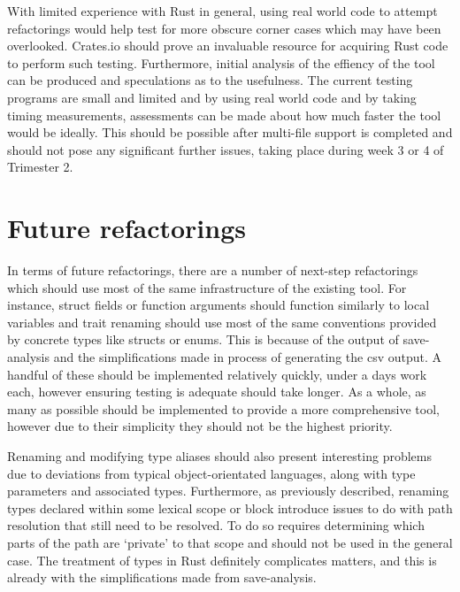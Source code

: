 With limited experience with Rust in general, using real world code to attempt refactorings would help test for more obscure corner cases which may have been overlooked. Crates.io \cite{cratesio15} should prove an invaluable resource for acquiring Rust code to perform such testing. Furthermore, initial analysis of the effiency of the tool can be produced and speculations as to the usefulness. The current testing programs are small and limited and by using real world code and by taking timing measurements, assessments can be made about how much faster the tool would be ideally. This should be possible after multi-file support is completed and should not pose any significant further issues, taking place during week 3 or 4 of Trimester 2.

\section{Future refactorings}
In terms of future refactorings, there are a number of next-step refactorings which should use most of the same infrastructure of the existing tool. For instance, struct fields or function arguments should function similarly to local variables and trait renaming should use most of the same conventions provided by concrete types like structs or enums. This is because of the output of save-analysis and the simplifications made in process of generating the csv output. A handful of these should be implemented relatively quickly, under a days work each, however ensuring testing is adequate should take longer. As a whole, as many as possible should be implemented to provide a more comprehensive tool, however due to their simplicity they should not be the highest priority.

Renaming and modifying type aliases should also present interesting problems due to deviations from typical object-orientated languages, along with type parameters and associated types. Furthermore, as previously described, renaming types declared within some lexical scope or block introduce issues to do with path resolution that still need to be resolved. To do so requires determining which parts of the path are `private' to that scope and should not be used in the general case. The treatment of types in Rust definitely complicates matters, and this is already with the simplifications made from save-analysis.

